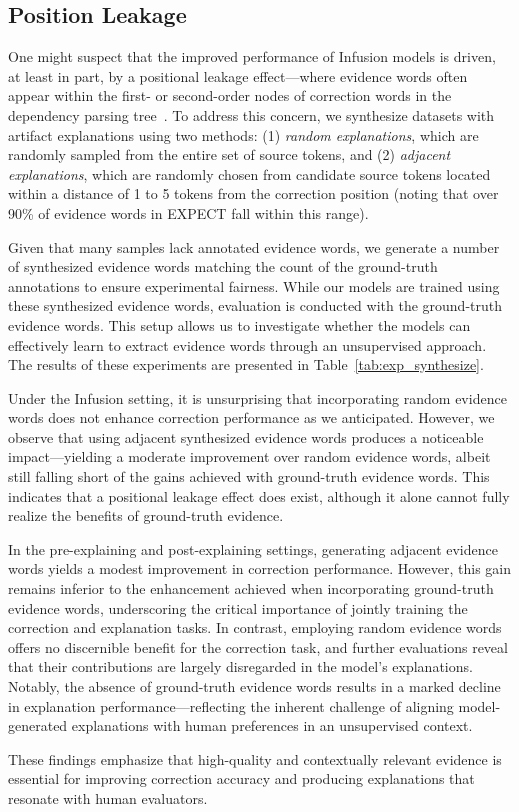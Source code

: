 




\subsection{Position Leakage}
One might suspect that the improved performance of Infusion models is driven, at least in part, by a positional leakage effect—where evidence words often appear within the first- or second-order nodes of correction words in the dependency parsing tree~\citep{fei-etal-2023-enhancing}. To address this concern, we synthesize datasets with artifact explanations using two methods: (1) \textit{random explanations}, which are randomly sampled from the entire set of source tokens, and (2) \textit{adjacent explanations}, which are randomly chosen from candidate source tokens located within a distance of 1 to 5 tokens from the correction position (noting that over 90\% of evidence words in EXPECT fall within this range).

Given that many samples lack annotated evidence words, we generate a number of synthesized evidence words matching the count of the ground-truth annotations to ensure experimental fairness. While our models are trained using these synthesized evidence words, evaluation is conducted with the ground-truth evidence words. This setup allows us to investigate whether the models can effectively learn to extract evidence words through an unsupervised approach. The results of these experiments are presented in Table~\ref{tab:exp_synthesize}.

Under the Infusion setting, it is unsurprising that incorporating random evidence words does not enhance correction performance as we anticipated. However, we observe that using adjacent synthesized evidence words produces a noticeable impact—yielding a moderate improvement over random evidence words, albeit still falling short of the gains achieved with ground-truth evidence words. This indicates that a positional leakage effect does exist, although it alone cannot fully realize the benefits of ground-truth evidence.

In the pre-explaining and post-explaining settings, generating adjacent evidence words yields a modest improvement in correction performance. However, this gain remains inferior to the enhancement achieved when incorporating ground-truth evidence words, underscoring the critical importance of jointly training the correction and explanation tasks. In contrast, employing random evidence words offers no discernible benefit for the correction task, and further evaluations reveal that their contributions are largely disregarded in the model’s explanations. Notably, the absence of ground-truth evidence words results in a marked decline in explanation performance—reflecting the inherent challenge of aligning model-generated explanations with human preferences in an unsupervised context.

These findings emphasize that high-quality and contextually relevant evidence is essential for improving correction accuracy and producing explanations that resonate with human evaluators.

